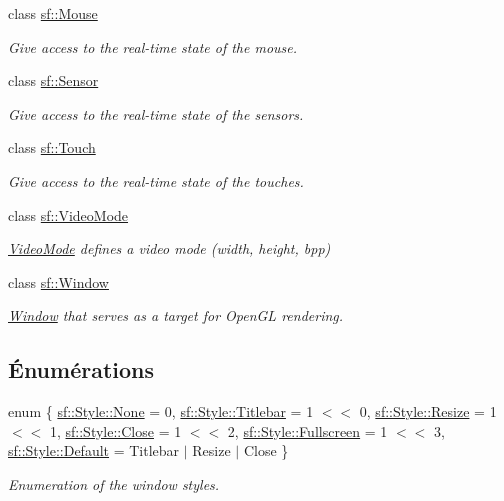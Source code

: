 \begin{DoxyCompactItemize}
class \hyperlink{classsf_1_1Mouse}{sf\+::\+Mouse}
\begin{DoxyCompactList}\small\item\em Give access to the real-\/time state of the mouse. \end{DoxyCompactList}\item 
class \hyperlink{classsf_1_1Sensor}{sf\+::\+Sensor}
\begin{DoxyCompactList}\small\item\em Give access to the real-\/time state of the sensors. \end{DoxyCompactList}\item 
class \hyperlink{classsf_1_1Touch}{sf\+::\+Touch}
\begin{DoxyCompactList}\small\item\em Give access to the real-\/time state of the touches. \end{DoxyCompactList}\item 
class \hyperlink{classsf_1_1VideoMode}{sf\+::\+Video\+Mode}
\begin{DoxyCompactList}\small\item\em \hyperlink{classsf_1_1VideoMode}{Video\+Mode} defines a video mode (width, height, bpp) \end{DoxyCompactList}\item 
class \hyperlink{classsf_1_1Window}{sf\+::\+Window}
\begin{DoxyCompactList}\small\item\em \hyperlink{classsf_1_1Window}{Window} that serves as a target for Open\+GL rendering. \end{DoxyCompactList}\end{DoxyCompactItemize}
\subsection*{Énumérations}
\begin{DoxyCompactItemize}
\item 
enum \{ \newline
\hyperlink{group__window_gga8d7a3b8425c907a2872cb57e32cea5b8a8c35a9c8507559e455387fc4a83ce422}{sf\+::\+Style\+::\+None} = 0, 
\hyperlink{group__window_gga8d7a3b8425c907a2872cb57e32cea5b8ab4c8b32b05ed715928513787cb1e85b6}{sf\+::\+Style\+::\+Titlebar} = 1 $<$$<$ 0, 
\hyperlink{group__window_gga8d7a3b8425c907a2872cb57e32cea5b8accff967648ebcd5db2007eff7352b50f}{sf\+::\+Style\+::\+Resize} = 1 $<$$<$ 1, 
\hyperlink{group__window_gga8d7a3b8425c907a2872cb57e32cea5b8ae07a7d411d5acf28f4a9a4b76a3a9493}{sf\+::\+Style\+::\+Close} = 1 $<$$<$ 2, 
\newline
\hyperlink{group__window_gga8d7a3b8425c907a2872cb57e32cea5b8a6288ec86830245cf957e2d234f79f50d}{sf\+::\+Style\+::\+Fullscreen} = 1 $<$$<$ 3, 
\hyperlink{group__window_gga8d7a3b8425c907a2872cb57e32cea5b8a5597cd420fc461807e4a201c92adea37}{sf\+::\+Style\+::\+Default} = Titlebar $\vert$ Resize $\vert$ Close
 \}\begin{DoxyCompactList}\small\item\em Enumeration of the window styles. \end{DoxyCompactList}
\end{DoxyCompactItemize}


